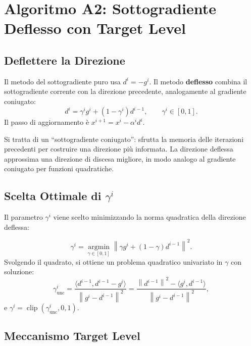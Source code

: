 \documentclass[11pt,a4paper]{article}
\theoremstyle{definition}
\theoremstyle{plain}
\theoremstyle{remark}
\newcommand{\norm}[1]{\left\| #1 \right\|}
\newcommand{\argmin}{\operatorname*{argmin}}
\begin{document}
\section{Algoritmo A2: Sottogradiente Deflesso con Target Level}
\label{sec:a2}

\subsection{Deflettere la Direzione}

Il metodo del sottogradiente puro usa $d^i = -g^i$.
Il metodo \textbf{deflesso} combina il sottogradiente corrente con la direzione precedente,
analogamente al gradiente coniugato:
\[
  d^i = \gamma^i g^i + (1 - \gamma^i) d^{i-1}, \qquad \gamma^i \in [0, 1].
\]
Il passo di aggiornamento è $x^{i+1} = x^i - \alpha^i d^i$.

\begin{intubox}
  Si tratta di un ``sottogradiente coniugato'': sfrutta la memoria delle iterazioni precedenti
  per costruire una direzione più informata. La direzione deflessa approssima una
  direzione di discesa migliore, in modo analogo al gradiente coniugato per funzioni quadratiche.
\end{intubox}

\subsection{Scelta Ottimale di $\gamma^i$}

Il parametro $\gamma^i$ viene scelto minimizzando la norma quadratica della direzione deflessa:

\begin{keybox}
  \[
    \gamma^i = \argmin_{\gamma \in [0,1]} \norm{\gamma g^i + (1-\gamma) d^{i-1}}^2.
  \]
  Svolgendo il quadrato, si ottiene un problema quadratico univariato in $\gamma$ con soluzione:
  \[
    \gamma^i_{\text{unc}}
    = \frac{\langle d^{i-1}, d^{i-1} - g^i \rangle}{\norm{g^i - d^{i-1}}^2}
    = \frac{\norm{d^{i-1}}^2 - \langle g^i, d^{i-1}\rangle}{\norm{g^i - d^{i-1}}^2},
  \]
  e $\gamma^i = \operatorname{clip}(\gamma^i_{\text{unc}}, 0, 1)$.
\end{keybox}

\subsection{Meccanismo Target Level}
\end{document}
